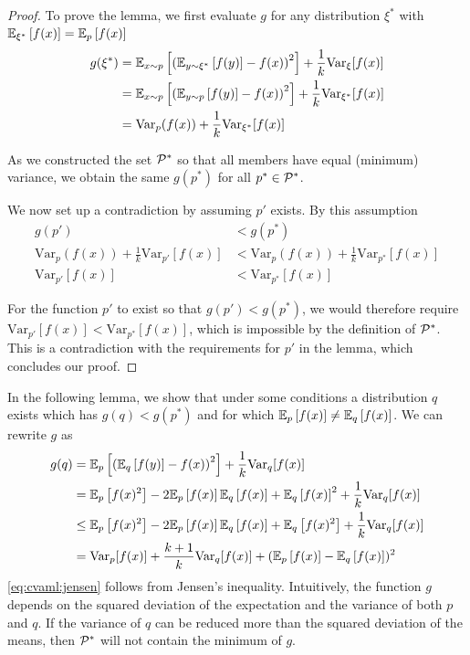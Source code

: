 \begin{proof}
    To prove the lemma, we first evaluate $g$ for any distribution $\xi^*$ with $\EEX{\xi^*}{f(x)} = \EEX{p}{f(x)}$ 
    \begin{align}
        g(\xi^*) &= \EEX{x \sim p}{\left(\EEX{y \sim \xi^*}{f(y)} - f(x)\right)^2} + \frac{1}{k}\mathrm{Var}_\xi[f(x)]\\
        &= \EEX{x \sim p}{\left(\EEX{y \sim p}{f(y)} - f(x)\right)^2} + \frac{1}{k}\mathrm{Var}_{\xi^*}[f(x)]\\
        &= \mathrm{Var}_{p}(f(x)) + \frac{1}{k}\mathrm{Var}_{\xi^*}[f(x)]
    \end{align}
    
    As we constructed the set $\P^*$ so that all members have equal (minimum) variance, we obtain the same $g(p^*)$ for all $p^*\in\P^*$.

    We now set up a contradiction by assuming $p'$ exists. By this assumption
    \begin{align}
        g(p') &< g(p^*) \\
        \mathrm{Var}_{p}(f(x)) + \frac{1}{k}\mathrm{Var}_{p'}[f(x)] &< \mathrm{Var}_{p}(f(x)) + \frac{1}{k}\mathrm{Var}_{p^*}[f(x)]\\
        \mathrm{Var}_{p'}[f(x)] &< \mathrm{Var}_{p^*}[f(x)]
    \end{align}

    For the function $p'$ to exist so that $g(p') < g(p^*)$, we would therefore require $\mathrm{Var}_{p'}[f(x)] < \mathrm{Var}_{p^*}[f(x)]$, which is impossible by the definition of $\P^*$.
    This is a contradiction with the requirements for $p'$ in the lemma, which concludes our proof.
\end{proof}

In the following lemma, we show that under some conditions a distribution $q$ exists which has $g(q) < g(p^*)$ and for which $\EEX{p}{f(x)} \neq \EEX{q}{f(x)}$.
We can rewrite $g$ as
\begin{align}
    g(q) &=\EEX{p}{\left(\EEX{q}{f(y)} - f(x)\right)^2} + \frac{1}{k}\mathrm{Var}_q[f(x)] \\
    &= \EEX{p}{f(x)^2} - 2\EEX{p}{f(x)}\EEX{q}{f(x)} + \EEX{q}{f(x)}^2 + \frac{1}{k}\mathrm{Var}_q[f(x)]\\
    & \leq \EEX{p}{f(x)^2} - 2\EEX{p}{f(x)}\EEX{q}{f(x)} + \EEX{q}{f(x)^2}  + \frac{1}{k}\mathrm{Var}_q[f(x)]\label{eq:cvaml:jensen}\\
    & = \mathrm{Var}_p[f(x)] + \frac{k + 1}{k}\mathrm{Var}_q[f(x)] + (\EEX{p}{f(x)} - \EEX{q}{f(x)})^2
\end{align}
\autoref{eq:cvaml:jensen} follows from Jensen's inequality.
Intuitively, the function $g$ depends on the squared deviation of the expectation and the variance of both $p$ and $q$.
If the variance of $q$ can be reduced more than the squared deviation of the means, then $\P^*$ will not contain the minimum of $g$.

